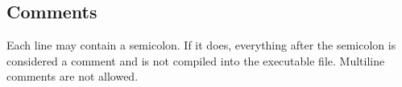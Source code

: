 \subsection{Comments}

Each line may contain a semicolon.
If it does, everything after the semicolon is considered a comment and
is not compiled into the executable file.
Multiline comments are not allowed.
